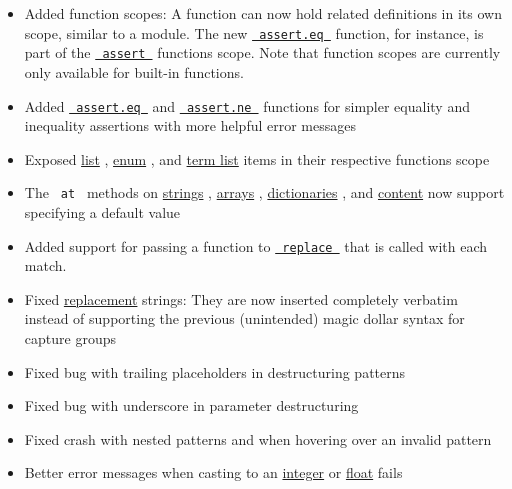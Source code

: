 \begin{itemize}
\tightlist
\item
  Added function scopes: A function can now hold related definitions in
  its own scope, similar to a module. The new
  \href{/docs/reference/foundations/assert/\#definitions-eq}{\texttt{\ assert.eq\ }}
  function, for instance, is part of the
  \href{/docs/reference/foundations/assert/}{\texttt{\ assert\ }}
  function\textquotesingle s scope. Note that function scopes are
  currently only available for built-in functions.
\item
  Added
  \href{/docs/reference/foundations/assert/\#definitions-eq}{\texttt{\ assert.eq\ }}
  and
  \href{/docs/reference/foundations/assert/\#definitions-ne}{\texttt{\ assert.ne\ }}
  functions for simpler equality and inequality assertions with more
  helpful error messages
\item
  Exposed \href{/docs/reference/model/list/\#definitions-item}{list} ,
  \href{/docs/reference/model/enum/\#definitions-item}{enum} , and
  \href{/docs/reference/model/terms/\#definitions-item}{term list} items
  in their respective functions\textquotesingle{} scope
\item
  The \texttt{\ at\ } methods on
  \href{/docs/reference/foundations/str/\#definitions-at}{strings} ,
  \href{/docs/reference/foundations/array/\#definitions-at}{arrays} ,
  \href{/docs/reference/foundations/dictionary/\#definitions-at}{dictionaries}
  , and
  \href{/docs/reference/foundations/content/\#definitions-at}{content}
  now support specifying a default value
\item
  Added support for passing a function to
  \href{/docs/reference/foundations/str/\#definitions-replace}{\texttt{\ replace\ }}
  that is called with each match.
\item
  Fixed
  \href{/docs/reference/foundations/str/\#definitions-replace}{replacement}
  strings: They are now inserted completely verbatim instead of
  supporting the previous (unintended) magic dollar syntax for capture
  groups
\item
  Fixed bug with trailing placeholders in destructuring patterns
\item
  Fixed bug with underscore in parameter destructuring
\item
  Fixed crash with nested patterns and when hovering over an invalid
  pattern
\item
  Better error messages when casting to an
  \href{/docs/reference/foundations/int/}{integer} or
  \href{/docs/reference/foundations/float/}{float} fails
\end{itemize}

